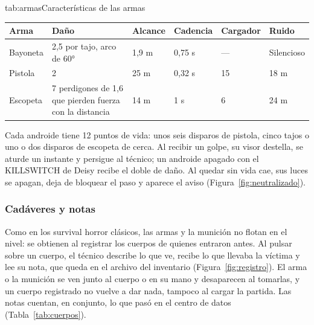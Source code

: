 \begin{TablaAPA}{tab:armas}{Características de las armas}
\begin{tabularx}{\linewidth}{P{2.4cm}LP{1.6cm}P{1.6cm}P{1.5cm}P{1.6cm}}
\toprule
Arma & Daño & Alcance & Cadencia & Cargador & Ruido \\
\midrule
Bayoneta & 2,5 por tajo, arco de 60° & 1,9 m & 0,75 s & --- & Silencioso \\
Pistola & 2 & 25 m & 0,32 s & 15 & 18 m \\
Escopeta & 7 perdigones de 1,6 que pierden fuerza con la distancia & 14 m & 1 s & 6 & 24 m \\
\bottomrule
\end{tabularx}
\end{TablaAPA}


Cada androide tiene 12 puntos de vida: unos seis disparos de pistola, cinco tajos o uno o dos
disparos de escopeta de cerca. Al recibir un golpe, su visor destella, se aturde un instante y
persigue al técnico; un androide apagado con el KILLSWITCH de Deisy recibe el doble de daño. Al
quedar sin vida cae, sus luces se apagan, deja de bloquear el paso y aparece el aviso
 (Figura~\ref{fig:neutralizado}).


\subsubsection{Cadáveres y notas}

Como en los survival horror clásicos, las armas y la munición no flotan en el nivel: se obtienen al
registrar los cuerpos de quienes entraron antes. Al pulsar  sobre un cuerpo, el técnico
describe lo que ve, recibe lo que llevaba la víctima y lee su nota, que queda en el archivo del
inventario (Figura~\ref{fig:registro}). El arma o la munición se ven junto al cuerpo o en su mano y
desaparecen al tomarlas, y un cuerpo registrado no vuelve a dar nada, tampoco al cargar la partida.
Las notas cuentan, en conjunto, lo que pasó en el centro de datos (Tabla~\ref{tab:cuerpos}).

